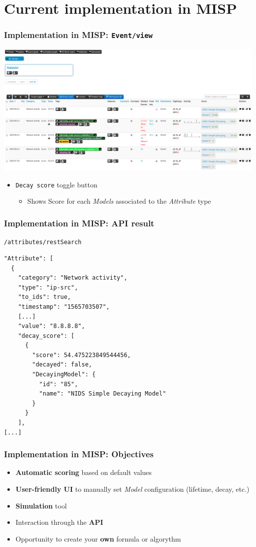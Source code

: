 \section{Current implementation in MISP}
\begin{frame}
    \frametitle{Implementation in MISP: \texttt{Event/view}}
    \includegraphics[width=1.00\linewidth]{pics/decaying-event.png}
    \begin{itemize}
        \item \texttt{Decay score} toggle button
        \begin{itemize}
            \item Shows Score for each \textit{Models} associated to the \textit{Attribute} type
        \end{itemize}
    \end{itemize}
\end{frame}

\begin{frame}[fragile]
    \frametitle{Implementation in MISP: API result}
    \texttt{/attributes/restSearch}
    \begin{lstlisting}
"Attribute": [
  {
    "category": "Network activity",
    "type": "ip-src",
    "to_ids": true,
    "timestamp": "1565703507",
    [...]
    "value": "8.8.8.8",
    "decay_score": [
      {
        "score": 54.475223849544456,
        "decayed": false,
        "DecayingModel": {
          "id": "85",
          "name": "NIDS Simple Decaying Model"
        }
      }
    ],
[...]
    \end{lstlisting}
\end{frame}

\begin{frame}
\frametitle{Implementation in MISP: Objectives}
    \begin{itemize}
        \item \textbf{Automatic scoring} based on default values
        \item \textbf{User-friendly UI} to manually set \textit{Model} configuration (lifetime, decay, etc.)
        \item \textbf{Simulation} tool
        \item Interaction through the \textbf{API}
        \item Opportunity to create your \textbf{own} formula or algorythm
    \end{itemize}
\end{frame}

